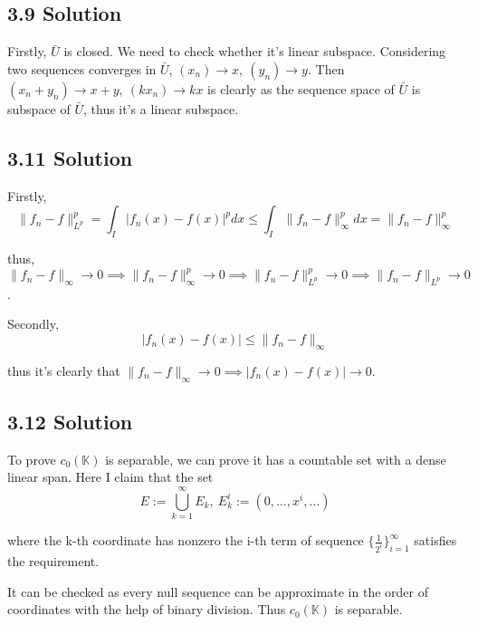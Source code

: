 \documentclass{article}
\begin{document}
\subsection*{3.9 Solution}
Firstly, \(\bar U\) is closed. We need to check whether it's linear subspace. Considering two sequences converges in \(\bar U\), \((x_n) \to x,\ (y_n) \to y\). Then \((x_n + y_n) \to x + y,\ (k x_n) \to kx\) is clearly as the sequence space of \(\bar U\) is subspace of \(\bar U\), thus it's a linear subspace. 




\subsection*{3.11 Solution}
Firstly,
\[\|f_n - f\|_{L^p}^p = \int_I |f_n(x) - f(x)|^p dx \le \int_I \|f_n - f\|_{\infty}^p dx = \|f_n - f\|_\infty^p\]

thus, \(\|f_n - f\|_{\infty} \to 0 \implies \|f_n - f\|_{\infty}^p \to 0 \implies \|f_n - f\|_{L^p}^p \to 0 \implies \|f_n - f\|_{L^p} \to 0\).

Secondly,
\[|f_n(x) - f(x)| \le \|f_n - f\|_{\infty}\]

thus it's clearly that \(\|f_n - f\|_{\infty} \to 0 \implies |f_n(x) - f(x)| \to 0\).



\subsection*{3.12 Solution}
To prove \(c_0(\mathbb K)\) is separable, we can prove it has a countable set with a dense linear span. Here I claim that the set
\[E := \bigcup_{k = 1}^\infty E_k,\ E_k^i := (0, \ldots, x^i, \ldots)\]

where the k-th coordinate has nonzero the i-th term of sequence \(\{\frac{1}{2^i}\}_{i = 1}^\infty\) satisfies the requirement.

It can be checked as every null sequence can be approximate in the order of coordinates with the help of binary division. Thus \(c_0(\mathbb K)\) is separable.

\end{document}

